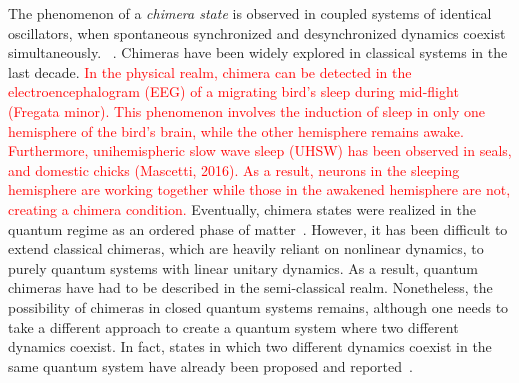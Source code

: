 \documentclass[12pt]{iopart}
\newcommand{\red}[1]{\textcolor{red}{#1}}
\begin{document}
The phenomenon of a \textit{ chimera state} is observed in coupled systems of  identical oscillators, when spontaneous synchronized and desynchronized dynamics coexist simultaneously. ~\cite{kuramoto_coexistence_2002, panaggio_chimera_2015}. Chimeras have been widely explored in classical systems in the last decade\cite{parastesh_chimeras_2021,chimera_book, taniya2022}. \red{In the physical realm, chimera can be detected in the electroencephalogram (EEG) of a migrating bird's sleep during mid-flight (Fregata minor\cite{Rattenborg2016}). This phenomenon involves the induction of sleep in only one hemisphere of the bird's brain, while the other hemisphere remains awake. Furthermore, unihemispheric slow wave sleep (UHSW) has been observed in seals, and domestic chicks (Mascetti, 2016). As a result, neurons in the sleeping hemisphere are working together while those in the awakened hemisphere are not, creating a chimera condition.} Eventually, chimera states were realized in the quantum regime as an ordered phase of matter~\cite{bastidas_quantum_2015}. However, it has been difficult to extend classical chimeras, which are heavily reliant on nonlinear dynamics, to purely quantum systems with linear unitary dynamics. As a result, quantum chimeras have had to be described in the semi-classical realm. Nonetheless, the possibility of chimeras in closed quantum systems remains, although one needs to take a different approach to create a quantum system where two different dynamics coexist. In fact, states in which two different dynamics coexist in the same quantum system have already been proposed and reported~\cite{Bastidas2018,Zha2020,sakurai_phys_nodate}. 
\end{document}
